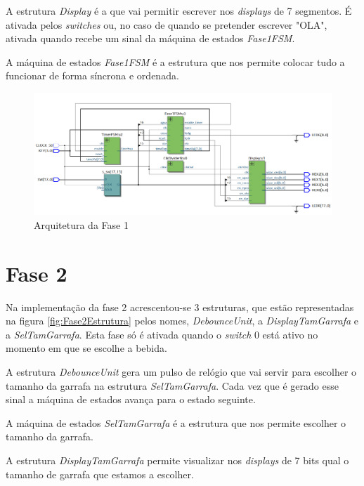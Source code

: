 \documentclass{report}
\begin{document}
A estrutura \textit{Display} é a que vai permitir escrever nos \textit{displays} de 7 segmentos. É ativada pelos \textit{switches} ou, no caso de quando se pretender escrever "OLA", ativada quando recebe um sinal da máquina de estados \textit{Fase1FSM}.

A máquina de estados \textit{Fase1FSM} é a estrutura que nos permite colocar tudo a funcionar de forma síncrona e ordenada.

\begin{figure}[H]
    \centering
    \includegraphics[width = \textwidth]{Fase1Estrutura.png}
    \caption{Arquitetura da Fase 1}
    \label{fig:Fase1Estrutura}
\end{figure} 


\section{Fase 2}

Na implementação da fase 2 acrescentou-se 3 estruturas, que estão representadas na figura \ref{fig:Fase2Estrutura} pelos nomes, \textit{DebounceUnit}, a \textit{Display\textunderscore Tam\textunderscore Garrafa} e a \textit{Sel\textunderscore Tam\textunderscore Garrafa}. Esta fase só é ativada quando o \textit{switch} 0 está ativo no momento em que se escolhe a bebida.

A estrutura \textit{DebounceUnit} gera um pulso de relógio que vai servir para escolher o tamanho da garrafa na estrutura \textit{Sel\textunderscore Tam\textunderscore Garrafa}. Cada vez que é gerado esse sinal a máquina de estados avança para o estado seguinte.

A máquina de estados \textit{Sel\textunderscore Tam\textunderscore Garrafa} é a estrutura que nos permite escolher o tamanho da garrafa.

A estrutura \textit{Display\textunderscore Tam\textunderscore Garrafa} permite visualizar nos \textit{displays} de 7 bits qual o tamanho de garrafa que estamos a escolher.
\end{document}
